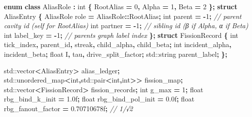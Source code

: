 \documentclass[
  11pt,
  a4paper,
]{article}
\newenvironment{Shaded}{\begin{snugshade}}{\end{snugshade}}
\newcommand{\BuiltInTok}[1]{#1}
\newcommand{\CommentTok}[1]{\textcolor[rgb]{0.56,0.35,0.01}{\textit{#1}}}
\newcommand{\DataTypeTok}[1]{\textcolor[rgb]{0.13,0.29,0.53}{#1}}
\newcommand{\DecValTok}[1]{\textcolor[rgb]{0.00,0.00,0.81}{#1}}
\newcommand{\FloatTok}[1]{\textcolor[rgb]{0.00,0.00,0.81}{#1}}
\newcommand{\KeywordTok}[1]{\textcolor[rgb]{0.13,0.29,0.53}{\textbf{#1}}}
\newcommand{\NormalTok}[1]{#1}
\newcommand{\OperatorTok}[1]{\textcolor[rgb]{0.81,0.36,0.00}{\textbf{#1}}}
\newcommand{\VariableTok}[1]{\textcolor[rgb]{0.00,0.00,0.00}{#1}}
\begin{document}
\begin{Shaded}
\begin{Highlighting}[]
\KeywordTok{enum} \KeywordTok{class}\NormalTok{ AliasRole }\OperatorTok{:} \DataTypeTok{int} \OperatorTok{\{}\NormalTok{ RootAlias }\OperatorTok{=} \DecValTok{0}\OperatorTok{,}\NormalTok{ Alpha }\OperatorTok{=} \DecValTok{1}\OperatorTok{,}\NormalTok{ Beta }\OperatorTok{=} \DecValTok{2} \OperatorTok{\};}
\KeywordTok{struct}\NormalTok{ AliasEntry }\OperatorTok{\{}
\NormalTok{    AliasRole role      }\OperatorTok{=}\NormalTok{ AliasRole}\OperatorTok{::}\NormalTok{RootAlias}\OperatorTok{;}
    \DataTypeTok{int}\NormalTok{       parent    }\OperatorTok{=} \OperatorTok{{-}}\DecValTok{1}\OperatorTok{;}   \CommentTok{// parent cavity id (self for RootAlias)}
    \DataTypeTok{int}\NormalTok{       partner   }\OperatorTok{=} \OperatorTok{{-}}\DecValTok{1}\OperatorTok{;}   \CommentTok{// sibling id (β if Alpha, α if Beta)}
    \DataTypeTok{int}\NormalTok{       label\_key }\OperatorTok{=} \OperatorTok{{-}}\DecValTok{1}\OperatorTok{;}   \CommentTok{// parent\textquotesingle{}s graph label index}
\OperatorTok{\};}
\KeywordTok{struct}\NormalTok{ FissionRecord }\OperatorTok{\{}
    \DataTypeTok{int}\NormalTok{    tick\_index}\OperatorTok{,}\NormalTok{ parent\_id}\OperatorTok{,}\NormalTok{ streak}\OperatorTok{,}\NormalTok{ child\_alpha}\OperatorTok{,}\NormalTok{ child\_beta}\OperatorTok{;}
    \DataTypeTok{int}\NormalTok{    incident\_alpha}\OperatorTok{,}\NormalTok{ incident\_beta}\OperatorTok{;}
    \DataTypeTok{float}\NormalTok{  I}\OperatorTok{,}\NormalTok{ tau}\OperatorTok{,}\NormalTok{ drive\_split\_factor}\OperatorTok{;}
    \BuiltInTok{std::}\NormalTok{string parent\_label}\OperatorTok{;}
\OperatorTok{\};}

\BuiltInTok{std::}\NormalTok{vector}\OperatorTok{\textless{}}\NormalTok{AliasEntry}\OperatorTok{\textgreater{}}\NormalTok{                       alias\_ledger}\OperatorTok{;}
\BuiltInTok{std::}\NormalTok{unordered\_map}\OperatorTok{\textless{}}\DataTypeTok{int}\OperatorTok{,}\BuiltInTok{std::}\NormalTok{pair}\OperatorTok{\textless{}}\DataTypeTok{int}\OperatorTok{,}\DataTypeTok{int}\OperatorTok{\textgreater{}\textgreater{}}\NormalTok{    fission\_map}\OperatorTok{;}
\BuiltInTok{std::}\NormalTok{vector}\OperatorTok{\textless{}}\NormalTok{FissionRecord}\OperatorTok{\textgreater{}}\NormalTok{                    fission\_records}\OperatorTok{;}
\DataTypeTok{int}   \VariableTok{g\_max}              \OperatorTok{=} \DecValTok{1}\OperatorTok{;}
\DataTypeTok{float}\NormalTok{ rbg\_bind\_k\_init    }\OperatorTok{=} \FloatTok{1.0}\BuiltInTok{f}\OperatorTok{;}
\DataTypeTok{float}\NormalTok{ rbg\_bind\_pol\_init  }\OperatorTok{=} \FloatTok{0.0}\BuiltInTok{f}\OperatorTok{;}
\DataTypeTok{float}\NormalTok{ rbg\_fanout\_factor  }\OperatorTok{=} \FloatTok{0.70710678}\BuiltInTok{f}\OperatorTok{;}   \CommentTok{// 1/√2}
\end{Highlighting}
\end{Shaded}
\end{document}
